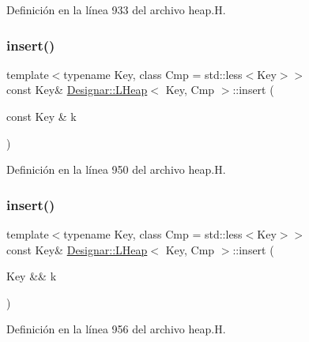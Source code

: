 Definición en la línea 933 del archivo heap.\+H.

\mbox{\label{class_designar_1_1_l_heap_afda890a8ad2058013a93ec6b3dbcb38d}} 
\subsubsection{\texorpdfstring{insert()}{insert()}\hspace{0.1cm}{\footnotesize\ttfamily [1/2]}}
{\footnotesize\ttfamily template$<$typename Key, class Cmp = std\+::less$<$\+Key$>$$>$ \\
const Key\& \hyperlink{class_designar_1_1_l_heap}{Designar\+::\+L\+Heap}$<$ Key, Cmp $>$\+::insert (\begin{DoxyParamCaption}\item[{const Key \&}]{k }\end{DoxyParamCaption})\hspace{0.3cm}{\ttfamily [inline]}}



Definición en la línea 950 del archivo heap.\+H.

\mbox{\label{class_designar_1_1_l_heap_a45e3853d6d7cd17fd5b56aa572fd6042}} 
\subsubsection{\texorpdfstring{insert()}{insert()}\hspace{0.1cm}{\footnotesize\ttfamily [2/2]}}
{\footnotesize\ttfamily template$<$typename Key, class Cmp = std\+::less$<$\+Key$>$$>$ \\
const Key\& \hyperlink{class_designar_1_1_l_heap}{Designar\+::\+L\+Heap}$<$ Key, Cmp $>$\+::insert (\begin{DoxyParamCaption}\item[{Key \&\&}]{k }\end{DoxyParamCaption})\hspace{0.3cm}{\ttfamily [inline]}}



Definición en la línea 956 del archivo heap.\+H.

\mbox{\label{class_designar_1_1_l_heap_a03ae70dddd0511210308b666c69c75e5}} 
